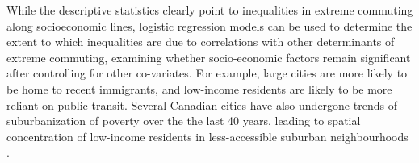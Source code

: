 \documentclass[10 pt,letterpaper]{article}
\begin{document}
While the descriptive statistics clearly point to inequalities in extreme commuting along socioeconomic lines, logistic regression models can be used to determine the extent to which inequalities are due to correlations with other determinants of extreme commuting, examining whether socio-economic factors remain significant after controlling for other co-variates. For example, large cities are more likely to be home to recent immigrants, and low-income residents are likely to be more reliant on public transit. Several Canadian cities have also undergone trends of suburbanization of poverty over the the last 40 years, leading to spatial concentration of low-income residents in less-accessible suburban neighbourhoods \cite{ades_is_2016,grant_changing_2020}. 


\begin{table}[H]
	
	\caption{Percent of commuters who have one-way commute times greater than 60min, 75min, and 90min in Canada in 2016 (Part 1)}
	
	\vspace{1mm}
	
	\small
\end{table}
\end{document}
